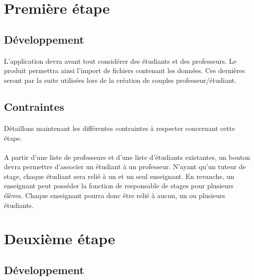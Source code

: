 \documentclass[a4paper,10pt]{report}
\begin{document}
    \section{Première étape}

      \subsection{Développement}
	\paragraph{}
	L'application devra avant tout considérer des étudiants et des professeurs.
	\newline
	Le produit permettra ainsi l'import de fichiers contenant les données. 
	Ces dernières seront par la suite utilisées lors de la création de couples professeur/étudiant. 
  
      \subsection{Contraintes}
	\paragraph{}
	Détaillons maintenant les différentes contraintes à respecter concernant cette étape. 
	\paragraph{}
	A partir d'une liste de professeurs et d'une liste d'étudiants existantes, un bouton devra permettre d'associer un étudiant à un professeur.
	N'ayant qu'un tuteur de stage, chaque étudiant sera relié à un et un seul enseignant.
	En revanche, un enseignant peut posséder la fonction de responsable de stages pour plusieurs élèves. 
	Chaque enseignant pourra donc être relié à aucun, un ou plusieurs étudiants.	
	
      
	
    \section{Deuxième étape}

      \subsection{Développement}
	
\end{document}
